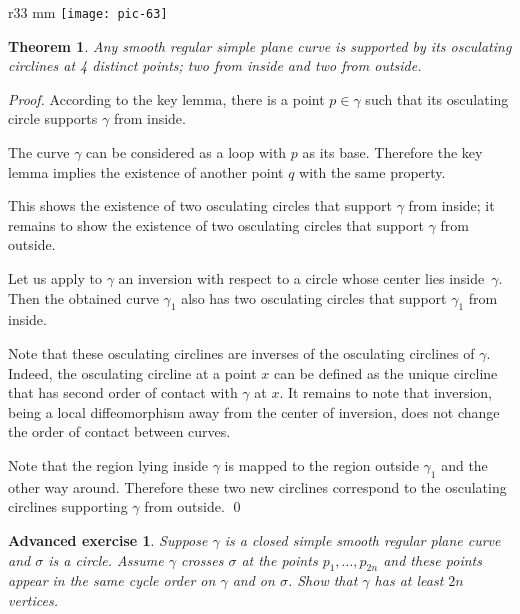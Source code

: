 \documentclass{article}
\theoremstyle{theorem}
\newtheorem{theorem}{Theorem}
\newtheorem*{advancedexercise}{Advanced exercise}
\theoremstyle{definition}
\begin{document}
{

\begin{wrapfigure}{r}{33 mm}
\vskip-4mm
\centering
\texttt{[image: pic-63]}
\vskip0mm
\end{wrapfigure}

\begin{theorem}\label{thm:4-vert}
Any smooth regular simple plane curve is supported by its osculating circlines at 4 distinct points; two from inside and two from outside.
\end{theorem}

\medskip\noindent\textit{Proof.}
According to the key lemma, there is a point $p\in\gamma$ such that its osculating circle supports $\gamma$ from inside.

The curve $\gamma$ can be considered as a loop with $p$ as its base.
Therefore the key lemma implies the existence of another point $q$ with the same property.


This shows the existence of two osculating circles that support $\gamma$ from inside;
it remains to show the existence of two osculating circles that support $\gamma$ from outside.

Let us apply to $\gamma$ an inversion with respect to a circle whose center lies inside~$\gamma$.
Then the obtained curve $\gamma_1$ also has  two osculating circles that support $\gamma_1$ from inside.

}

Note that these osculating circlines are inverses of the osculating circlines of $\gamma$.
Indeed, the osculating circline at a point $x$ can be defined as the unique circline that has second order of contact with $\gamma$ at $x$.
It remains to note that inversion, being a local diffeomorphism away from the center of inversion, does not change the order of contact between curves.

Note that the region lying inside $\gamma$ is mapped to the region outside $\gamma_1$ and the other way around.
Therefore these two new circlines correspond to the osculating circlines supporting $\gamma$ from outside.
\qed

\begin{advancedexercise}\label{ex:curve-crosses-circle}
Suppose $\gamma$ is a closed simple smooth regular plane curve and $\sigma$ is a circle.
Assume $\gamma$ crosses $\sigma$ at the points $p_1,\dots,p_{2 n}$ and these points appear in the same cycle order on $\gamma$ and on $\sigma$.
Show that $\gamma$ has at least $2 n$ vertices.
\end{advancedexercise}
\end{document}
